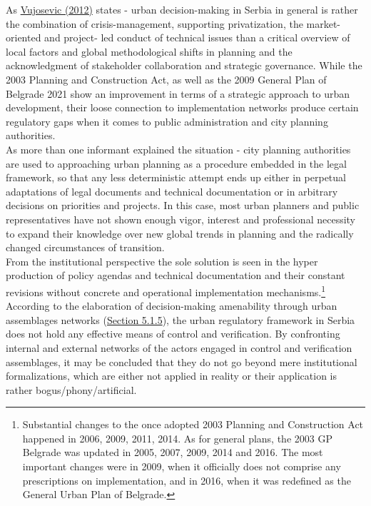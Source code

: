 \documentclass[11pt]{report}
\begin{document}
{{{{As \href{VUjosevic}{Vujosevic (2012)} states - urban decision-making in Serbia in general is rather the combination of crisis-management, supporting privatization, the market-oriented and project- led conduct of technical issues than a critical overview of local factors and global methodological shifts in planning and the acknowledgment of stakeholder collaboration and strategic governance. While the 2003 Planning and Construction Act, as well as the 2009 General Plan of Belgrade 2021 show an improvement in terms of a strategic approach to urban development, their loose connection to implementation networks produce certain regulatory gaps when it comes to public administration and city planning authorities.
\\

As more than one informant explained the situation - city planning authorities are used to approaching urban planning as a procedure embedded in the legal framework, so that any less deterministic attempt ends up either in perpetual adaptations of legal documents and technical documentation or in arbitrary decisions on priorities and projects. In this case, most urban planners and public representatives have not shown enough vigor, interest and professional necessity to expand their knowledge over new global trends in planning and the radically changed circumstances of transition.
\\

From the institutional perspective the sole solution is seen in the hyper production of policy agendas and technical documentation and their constant revisions without concrete and operational implementation mechanisms.\footnote{
Substantial changes to the once adopted 2003 Planning and Construction Act happened in 2006, 2009, 2011, 2014. As for general plans, the 2003 GP Belgrade was updated in 2005, 2007, 2009, 2014 and 2016. The most important changes were in 2009, when it officially does not comprise any prescriptions on implementation, and in 2016, when it was redefined as the General Urban Plan of Belgrade.}
According to the elaboration of decision-making amenability through urban assemblages networks (\href{Section 5.1.5}{Section 5.1.5}), the urban regulatory framework in Serbia does not hold any effective means of control and verification.
By confronting internal and external networks of the actors engaged in control and verification assemblages, it may be concluded that they do not go beyond mere institutional formalizations, which are either not applied in reality or their application is rather bogus/phony/artificial.
\\

}}}}
\end{document}
